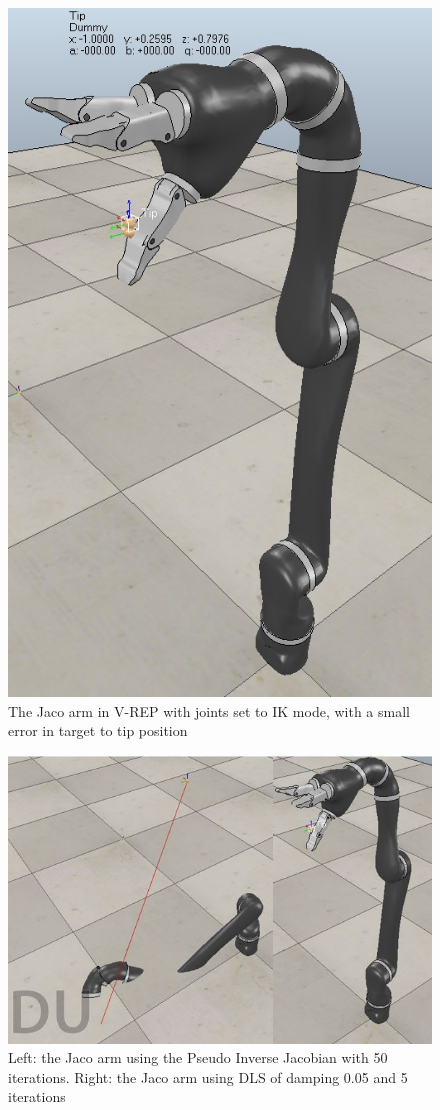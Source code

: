 \documentclass[12pt,openany,a4paper]{book}
\begin{document}
\begin{center}
\begin{figure}[htb]
  \includegraphics[width=0.5\linewidth]{Small_change_jaco.jpg}
\caption{The Jaco arm in V-REP with joints set to IK mode, with a small error in target to tip position}
\end{figure}
\end{center}

\clearpage

\begin{center}
\begin{figure}[htb]
  \includegraphics[width=0.9\linewidth]{Small_change_jaco_result.jpg}
\caption{Left: the Jaco arm using the Pseudo Inverse Jacobian with 50 iterations. Right: the Jaco arm using DLS of damping 0.05 and 5 iterations}
\end{figure}
\end{center}
\end{document}
